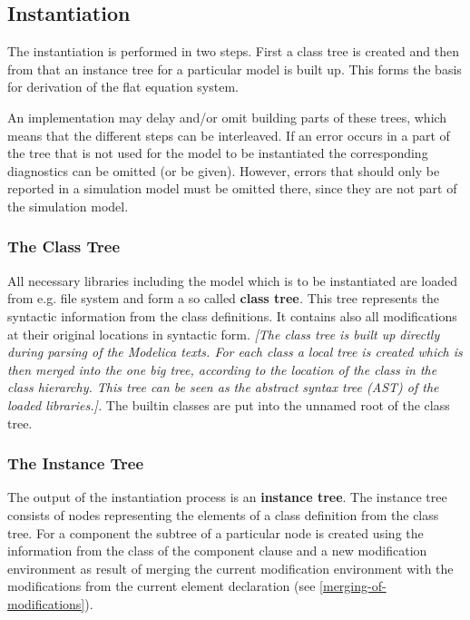 \subsection{Instantiation}

The instantiation is performed in two steps. First a class tree is
created and then from that an instance tree for a particular model is
built up. This forms the basis for derivation of the flat equation
system.

An implementation may delay and/or omit building parts of these trees,
which means that the different steps can be interleaved. If an error
occurs in a part of the tree that is not used for the model to be
instantiated the corresponding diagnostics can be omitted (or be given).
However, errors that should only be reported in a simulation model must
be omitted there, since they are not part of the simulation model.

\subsubsection{The Class Tree}

All necessary libraries including the model which is to be instantiated
are loaded from e.g. file system and form a so called \textbf{class
tree}\emph{.} This tree represents the syntactic information from the
class definitions. It contains also all modifications at their original
locations in syntactic form. \emph{{[}The class tree is built up
directly during parsing of the Modelica texts. For each class a local
tree is created which is then merged into the one big tree, according to
the location of the class in the class hierarchy. This tree can be seen
as the abstract syntax tree (AST) of the loaded libraries.{]}.} The
builtin classes are put into the unnamed root of the class tree.

\subsubsection{The Instance Tree}

The output of the instantiation process is an \textbf{instance tree}.
The instance tree consists of nodes representing the elements of a class
definition from the class tree. For a component the subtree of a
particular node is created using the information from the class of the
component clause and a new modification environment as result of merging
the current modification environment with the modifications from the
current element declaration (see \ref{merging-of-modifications}).

